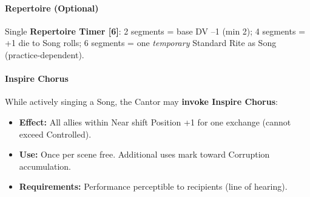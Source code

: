 \paragraph{Repertoire (Optional)}
Single \textbf{Repertoire Timer [6]}: 2 segments = base DV --1 (min 2); 4 segments = +1 die to Song rolls; 6 segments = one \emph{temporary} Standard Rite as Song (practice-dependent).

\paragraph{Inspire Chorus}\label{subsec:inspire_chorus}
While actively singing a Song, the Cantor may \textbf{invoke Inspire Chorus}:
\begin{itemize}
    \item \textbf{Effect:} All allies within Near shift Position +1 for one exchange (cannot exceed Controlled).
    \item \textbf{Use:} Once per scene free. Additional uses mark toward Corruption accumulation.
    \item \textbf{Requirements:} Performance perceptible to recipients (line of hearing).
\end{itemize}

